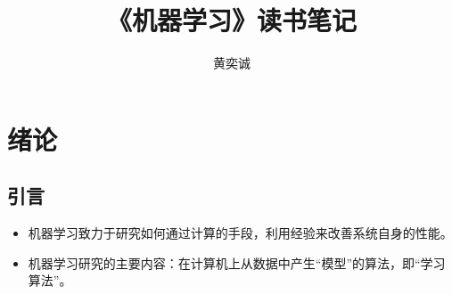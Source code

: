 \documentclass{ctexart}
\begin{document}
			\title{《机器学习》读书笔记}
			\author{黄奕诚}
			\date{}
			\maketitle
			
			\tableofcontents
			\newpage
			\section{绪论}
				\subsection{引言}
					\begin{itemize}
						\item 机器学习致力于研究如何通过计算的手段，利用经验来改善系统自身的性能。
						\item 机器学习研究的主要内容：在计算机上从数据中产生``模型''的算法，即``学习算法''。
					\end{itemize}
\end{document}
